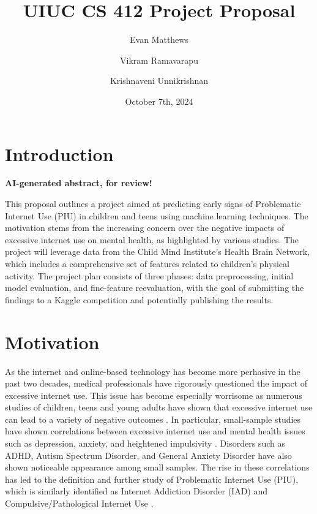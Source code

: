 \documentclass[12pt]{extarticle}
\title{UIUC CS 412 Project Proposal}
\author[1]{Evan Matthews}
\author[1]{Vikram Ramavarapu}
\author[1]{Krishnaveni Unnikrishnan}
\affil[1]{Siebel School of Computing and Data Science}
\date{October 7th, 2024}
\begin{document}
\maketitle

\section{Introduction}

\begin{mdframed}
\textbf{AI-generated abstract, for review!}

This proposal outlines a project aimed at predicting early signs of Problematic Internet Use (PIU) in children and teens using machine learning techniques. 
The motivation stems from the increasing concern over the negative impacts of excessive internet use on mental health, as highlighted by various studies. 
The project will leverage data from the Child Mind Institute's Health Brain Network, which includes a comprehensive set of features related to children's physical activity. 
The project plan consists of three phases: data preprocessing, initial model evaluation, and fine-feature reevaluation, with the goal of submitting the findings to a Kaggle competition and potentially publishing the results.
\end{mdframed}


\section{Motivation}

As the internet and online-based technology has become more perhasive in the past two decades, medical professionals have rigorously questioned the impact of excessive internet use.
This issue has become especially worrisome as numerous studies of children, teens and young adults have shown that excessive internet use can lead to a variety of negative outcomes \cite{Pettorruso2020-qt,Cash2012-rb,Aboujaoude2010-mc,Restrepo2020-pb}.
In particular, small-sample studies have shown correlations between excessive internet use and mental health issues such as depression, anxiety, and heightened impulsivity \cite{Cash2012-rb}.
Disorders such as ADHD, Autism Spectrum Disorder, and General Anxiety Disorder have also shown noticeable appearance among small samples\cite{Restrepo2020-pb}. 
The rise in these correlations has led to the definition and further study of Problematic Internet Use (PIU), which is similarly identified as Internet Addiction Disorder (IAD) and Compulsive/Pathological Internet Use \cite{Restrepo2020-pb}.
\end{document}
